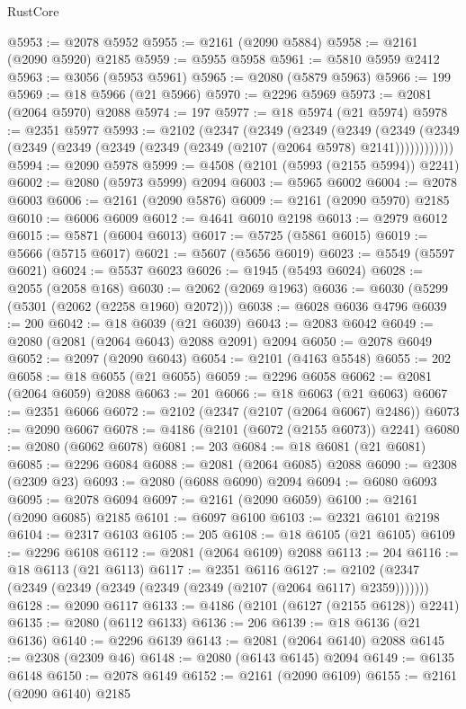 \begin{lexlean}{RustCore}
\begin{coremodule}
@5953 := @2078 @5952
@5955 := @2161 (@2090 @5884)
@5958 := @2161 (@2090 @5920) @2185
@5959 := @5955 @5958
@5961 := @5810 @5959 @2412
@5963 := @3056 (@5953 @5961)
@5965 := @2080 (@5879 @5963)
@5966 := 199
@5969 := @18 @5966 (@21 @5966)
@5970 := @2296 @5969
@5973 := @2081 (@2064 @5970) @2088
@5974 := 197
@5977 := @18 @5974 (@21 @5974)
@5978 := @2351 @5977
@5993 := @2102
    (@2347
      (@2349
        (@2349
          (@2349
            (@2349 (@2349 (@2349 (@2349 (@2349 (@2349 (@2349 (@2107 (@2064 @5978) @2141))))))))))))
@5994 := @2090 @5978
@5999 := @4508 (@2101 (@5993 (@2155 @5994)) @2241)
@6002 := @2080 (@5973 @5999) @2094
@6003 := @5965 @6002
@6004 := @2078 @6003
@6006 := @2161 (@2090 @5876)
@6009 := @2161 (@2090 @5970) @2185
@6010 := @6006 @6009
@6012 := @4641 @6010 @2198
@6013 := @2979 @6012
@6015 := @5871 (@6004 @6013)
@6017 := @5725 (@5861 @6015)
@6019 := @5666 (@5715 @6017)
@6021 := @5607 (@5656 @6019)
@6023 := @5549 (@5597 @6021)
@6024 := @5537 @6023
@6026 := @1945 (@5493 @6024)
@6028 := @2055 (@2058 @168)
@6030 := @2062 (@2069 @1963)
@6036 := @6030 (@5299 (@5301 (@2062 (@2258 @1960) @2072)))
@6038 := @6028 @6036 @4796
@6039 := 200
@6042 := @18 @6039 (@21 @6039)
@6043 := @2083 @6042
@6049 := @2080 (@2081 (@2064 @6043) @2088 @2091) @2094
@6050 := @2078 @6049
@6052 := @2097 (@2090 @6043)
@6054 := @2101 (@4163 @5548)
@6055 := 202
@6058 := @18 @6055 (@21 @6055)
@6059 := @2296 @6058
@6062 := @2081 (@2064 @6059) @2088
@6063 := 201
@6066 := @18 @6063 (@21 @6063)
@6067 := @2351 @6066
@6072 := @2102 (@2347 (@2107 (@2064 @6067) @2486))
@6073 := @2090 @6067
@6078 := @4186 (@2101 (@6072 (@2155 @6073)) @2241)
@6080 := @2080 (@6062 @6078)
@6081 := 203
@6084 := @18 @6081 (@21 @6081)
@6085 := @2296 @6084
@6088 := @2081 (@2064 @6085) @2088
@6090 := @2308 (@2309 @23)
@6093 := @2080 (@6088 @6090) @2094
@6094 := @6080 @6093
@6095 := @2078 @6094
@6097 := @2161 (@2090 @6059)
@6100 := @2161 (@2090 @6085) @2185
@6101 := @6097 @6100
@6103 := @2321 @6101 @2198
@6104 := @2317 @6103
@6105 := 205
@6108 := @18 @6105 (@21 @6105)
@6109 := @2296 @6108
@6112 := @2081 (@2064 @6109) @2088
@6113 := 204
@6116 := @18 @6113 (@21 @6113)
@6117 := @2351 @6116
@6127 := @2102 (@2347 (@2349 (@2349 (@2349 (@2349 (@2349 (@2107 (@2064 @6117) @2359)))))))
@6128 := @2090 @6117
@6133 := @4186 (@2101 (@6127 (@2155 @6128)) @2241)
@6135 := @2080 (@6112 @6133)
@6136 := 206
@6139 := @18 @6136 (@21 @6136)
@6140 := @2296 @6139
@6143 := @2081 (@2064 @6140) @2088
@6145 := @2308 (@2309 @46)
@6148 := @2080 (@6143 @6145) @2094
@6149 := @6135 @6148
@6150 := @2078 @6149
@6152 := @2161 (@2090 @6109)
@6155 := @2161 (@2090 @6140) @2185

\end{coremodule}
\end{lexlean}
